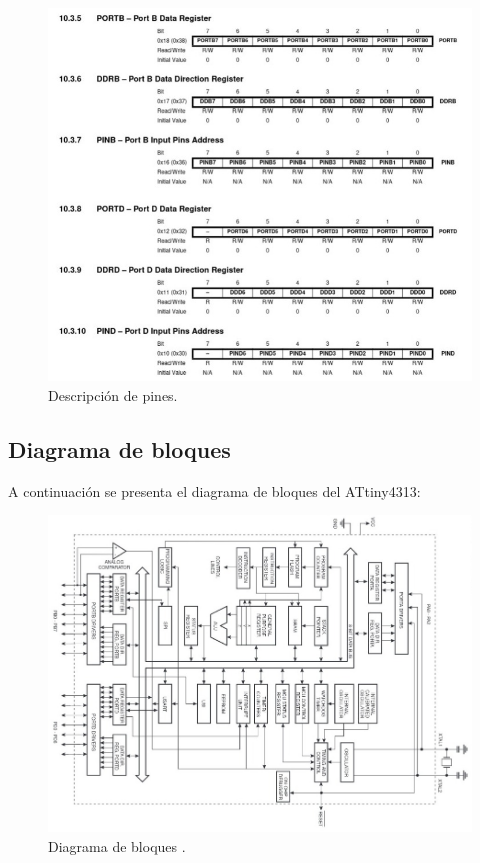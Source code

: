 \begin{figure}[H]
    \centering
    \includegraphics[scale=0.45]{images/puerto.jpeg}
    \caption{Descripción de pines\cite{Atmel2011}.}
    \label{fig:descripcion_pines}
\end{figure}

\subsection{Diagrama de bloques}
A continuación se presenta el diagrama de bloques del ATtiny4313:
\begin{figure}[H]
    \centering
    \includegraphics[angle=90, scale=0.4]{images/Diagra_bloques.jpeg}
    \caption{Diagrama de bloques \cite{Atmel2011}.}
    \label{fig:enter-label}
\end{figure}

